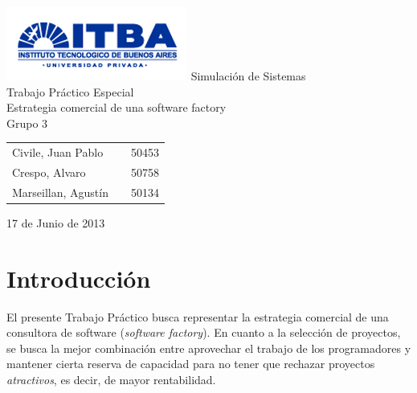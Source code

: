 \documentclass[a4paper,10pt]{article}
\begin{document}
\setcounter{secnumdepth}{5}
\setcounter{tocdepth}{5}

\begin{titlepage}
        \vfill
        \thispagestyle{empty}
        \begin{center}
                \includegraphics{./images/itba_logo.png}
                \vfill
                \Huge{Simulación de Sistemas}\\
                \vspace{1cm}
                \Huge{Trabajo Pr\'actico Especial}\\
                \vspace{1cm}
                \Huge{Estrategia comercial de una software factory}\\
                \vspace{1cm}
                Grupo 3
        \end{center}
        \vfill
        \large{
        \begin{tabular}{lcr}
                Civile, Juan Pablo && 50453\\
                Crespo, Alvaro && 50758 \\
                Marseillan, Agustín && 50134\\
        \end{tabular}
}
        \vspace{2cm}
        \begin{center}
                \large{17 de Junio de 2013}\\
        \end{center}
\end{titlepage}
\newpage

\setcounter{page}{1}

\section{Introducción}

El presente Trabajo Práctico busca representar la estrategia comercial de una consultora de software (\textit{software factory}). En cuanto a la selección de proyectos, se busca 
la mejor combinación entre aprovechar el trabajo de los programadores y mantener cierta reserva de capacidad para no tener que rechazar proyectos \textit{atractivos}, es decir,
de mayor rentabilidad.\\
\end{document}

